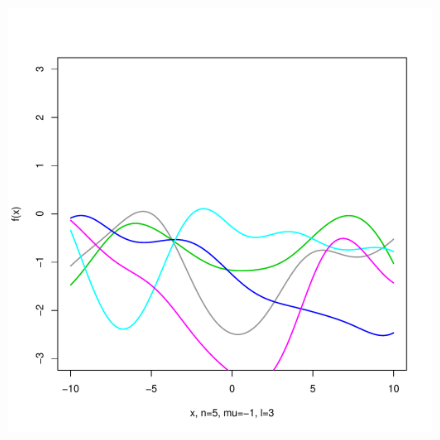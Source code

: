 \documentclass[12pt,letterpaper]{article}
\begin{document}
\begin{figure}
\begin{center}
\includegraphics[scale=0.2]{hw321/n5-m-1-l3.pdf}
\end{center}
\end{figure}
\end{document}
